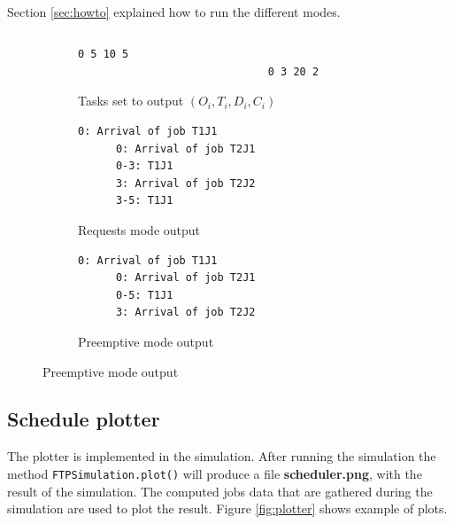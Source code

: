 \documentclass[letterpaper]{article}
\begin{document}
\paragraph{}
Section \ref{sec:howto} explained how to run the different modes.


\begin{figure}[H]
  \begin{subfigure}{1\textwidth}
    \begin{lstlisting}
    \end{lstlisting}
      \centering
      \begin{lstlisting}[numbers=none]
                              0 5 10 5
                              0 3 20 2
      \end{lstlisting}
      \caption{Tasks set to output $(O_i, T_i, D_i, C_i)$}
  \end{subfigure}
  \begin{subfigure}{.5\textwidth}
      \centering
      \begin{lstlisting}[numbers=none]
      0: Arrival of job T1J1
      0: Arrival of job T2J1
      0-3: T1J1
      3: Arrival of job T2J2
      3-5: T1J1
      \end{lstlisting}
      \caption{Requests mode output}
      \label{fig:req_mode}
  \end{subfigure}
  \begin{subfigure}{.5\textwidth}
      \centering
      \begin{lstlisting}[numbers=none]
      0: Arrival of job T1J1
      0: Arrival of job T2J1
      0-5: T1J1
      3: Arrival of job T2J2
      \end{lstlisting}
      \caption{Preemptive mode output}
      \label{fig:pre_mode}
  \end{subfigure}
\end{figure}

\subsection{Schedule plotter}

The plotter is implemented in the simulation. After running the simulation
the method \texttt{FTPSimulation.plot()} will produce a file
\textbf{scheduler.png}, with the result of the simulation. The computed jobs
data that are gathered during the simulation are used to plot the result.
Figure \ref{fig:plotter} shows example of plots.
\end{document}
